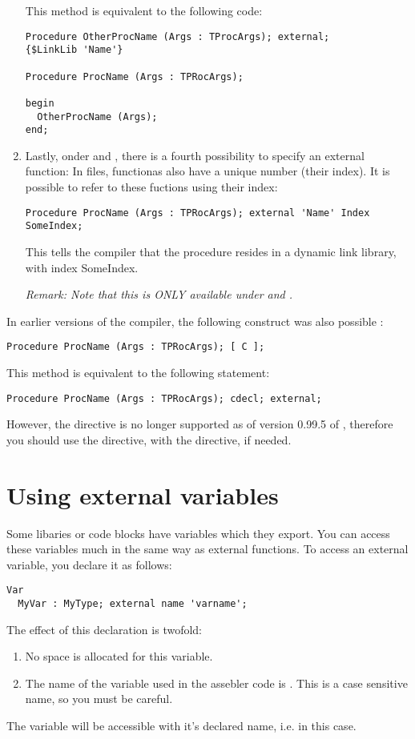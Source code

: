 \documentclass{report}
\begin{document}
\begin{enumerate}
This method is equivalent to the following code:
\begin{verbatim}
Procedure OtherProcName (Args : TProcArgs); external;
{$LinkLib 'Name'}

Procedure ProcName (Args : TPRocArgs);

begin
  OtherProcName (Args);
end;
\end{verbatim}
\item Lastly, onder \windows and \ostwo, there is a fourth possibility
to specify an external function: In  files, functionas also have
a unique number (their index). It is possible to refer to these fuctions
using their index:
\begin{verbatim}
Procedure ProcName (Args : TPRocArgs); external 'Name' Index SomeIndex;
\end{verbatim}
This tells the compiler that the procedure  resides in a
dynamic link library, with index {SomeIndex}.

\em{Remark:} Note that this is ONLY available under \windows and \ostwo.
\end{enumerate}

In earlier versions of the \fpc compiler, the following construct was
also possible :
\begin{verbatim}
Procedure ProcName (Args : TPRocArgs); [ C ];
\end{verbatim}
This method is equivalent to the following statement:
\begin{verbatim}
Procedure ProcName (Args : TPRocArgs); cdecl; external;
\end{verbatim}
However, the \var{[ C ]} directive is no longer supported as of version
0.99.5  of \fpc, therefore you should use the  directive, 
with the  directive, if needed.

\section{Using external variables}
\label{se:ExternalVars}

Some libaries or code blocks have variables which they export. You can access
these variables much in the same way as external functions. To access an
external variable, you declare it as follows:

\begin{verbatim}
Var
  MyVar : MyType; external name 'varname';
\end{verbatim}
The effect of this declaration is twofold:
\begin{enumerate}
\item No space is allocated for this variable.
\item The name of the variable used in the assebler code is .
This is a case sensitive name, so you must be careful. 
\end{enumerate}
The variable will be
accessible with it's declared name, i.e.  in this case.
\end{document}
